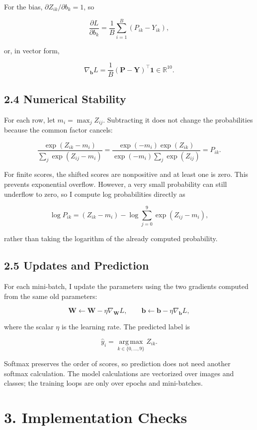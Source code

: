 \documentclass[UTF8,a4paper,12pt,fontset=fandol]{ctexart}
\begin{document}
For the bias, \(\partial Z_{ik}/\partial b_k=1\), so

\[
\frac{\partial L}{\partial b_k}
=\frac{1}{B}\sum_{i=1}^{B}(P_{ik}-Y_{ik}),
\]

or, in vector form,

\[
\boxed{
\nabla_{\boldsymbol{b}}L
=\frac{1}{B}(\boldsymbol{P}-\boldsymbol{Y})^{\top}\boldsymbol{1}}
\in\mathbb{R}^{10}.
\]

\subsection*{2.4 Numerical Stability}

For each row, let \(m_i=\max_j Z_{ij}\). Subtracting it does not change the probabilities because the common factor cancels:

\[
\frac{\exp(Z_{ik}-m_i)}{\sum_j\exp(Z_{ij}-m_i)}
=\frac{\exp(-m_i)\exp(Z_{ik})}
{\exp(-m_i)\sum_j\exp(Z_{ij})}
=P_{ik}.
\]

For finite scores, the shifted scores are nonpositive and at least one is zero. This prevents exponential overflow. However, a very small probability can still underflow to zero, so I compute log probabilities directly as

\[
\log P_{ik}
=(Z_{ik}-m_i)-\log\sum_{j=0}^{9}\exp(Z_{ij}-m_i),
\]

rather than taking the logarithm of the already computed probability.

\subsection*{2.5 Updates and Prediction}

For each mini-batch, I update the parameters using the two gradients computed from the same old parameters:

\[
\boldsymbol{W}\leftarrow\boldsymbol{W}-\eta\nabla_{\boldsymbol{W}}L,
\qquad
\boldsymbol{b}\leftarrow\boldsymbol{b}-\eta\nabla_{\boldsymbol{b}}L,
\]

where the scalar \(\eta\) is the learning rate. The predicted label is

\[
\hat{y}_i=\operatorname*{arg\,max}_{k\in\{0,\ldots,9\}}Z_{ik}.
\]

Softmax preserves the order of scores, so prediction does not need another softmax calculation. The model calculations are vectorized over images and classes; the training loops are only over epochs and mini-batches.

\section*{3. Implementation Checks}
\end{document}
